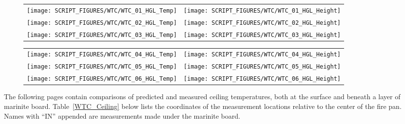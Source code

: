\begin{figure}[h!]
\begin{tabular*}{\textwidth}{l@{\extracolsep{\fill}}r}
\texttt{[image: SCRIPT\_FIGURES/WTC/WTC\_01\_HGL\_Temp]} &
\texttt{[image: SCRIPT\_FIGURES/WTC/WTC\_01\_HGL\_Height]} \\
\texttt{[image: SCRIPT\_FIGURES/WTC/WTC\_02\_HGL\_Temp]} &
\texttt{[image: SCRIPT\_FIGURES/WTC/WTC\_02\_HGL\_Height]} \\
\texttt{[image: SCRIPT\_FIGURES/WTC/WTC\_03\_HGL\_Temp]} &
\texttt{[image: SCRIPT\_FIGURES/WTC/WTC\_03\_HGL\_Height]}
\end{tabular*}
\end{figure}

\begin{figure}[p]
\begin{tabular*}{\textwidth}{l@{\extracolsep{\fill}}r}
\texttt{[image: SCRIPT\_FIGURES/WTC/WTC\_04\_HGL\_Temp]} &
\texttt{[image: SCRIPT\_FIGURES/WTC/WTC\_04\_HGL\_Height]} \\
\texttt{[image: SCRIPT\_FIGURES/WTC/WTC\_05\_HGL\_Temp]} &
\texttt{[image: SCRIPT\_FIGURES/WTC/WTC\_05\_HGL\_Height]} \\
\texttt{[image: SCRIPT\_FIGURES/WTC/WTC\_06\_HGL\_Temp]} &
\texttt{[image: SCRIPT\_FIGURES/WTC/WTC\_06\_HGL\_Height]}
\end{tabular*}
\end{figure}

\clearpage

The following pages contain comparisons of predicted and measured ceiling temperatures, both at the surface and beneath a layer of marinite board. Table~\ref{WTC_Ceiling} below lists the coordinates of the measurement locations relative to the center of the fire pan. Names with ``IN'' appended are measurements made under the marinite board.


